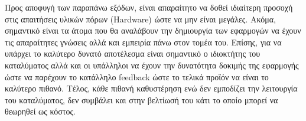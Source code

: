 		\noindent
		Προς αποφυγή των παραπάνω εξόδων, είναι απαραίτητο να δοθεί ιδιαίτερη προσοχή στις απαιτήσεις υλικών πόρων (Hardware) ώστε να μην είναι μεγάλες. Ακόμα, σημαντικό είναι τα άτομα που θα αναλάβουν την δημιουργία των εφαρμογών να έχουν τις απαραίτητες γνώσεις αλλά και εμπειρία πάνω στον τομέα του. Επίσης, για να υπάρχει το καλύτερο δυνατό αποτέλεσμα είναι σημαντικό ο ιδιοκτήτης του καταλύματος αλλά και οι υπάλληλοι να έχουν την δυνατότητα δοκιμής της εφαρμογής ώστε να παρέχουν το κατάλληλο feedback ώστε το τελικά προϊόν να είναι το καλύτερο πιθανό. Τέλος, κάθε πιθανή καθυστέρηση ενώ δεν εμποδίζει την λειτουργία του καταλύματος, δεν συμβάλει και στην βελτίωσή του κάτι το οποίο μπορεί να θεωρηθεί ως κόστος.
		
		
		    